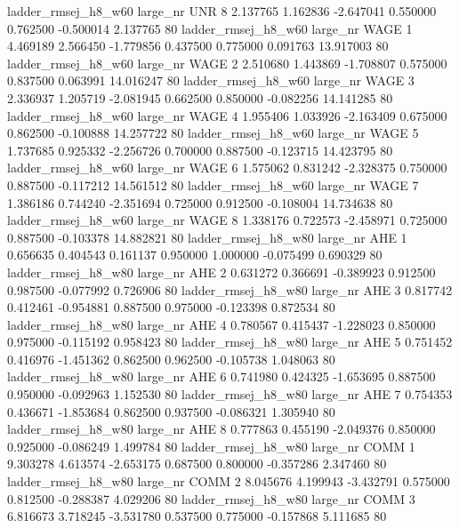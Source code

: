 ladder_rmsej_h8_w60   large_nr      UNR                 8  2.137765  1.162836  -2.647041 0.550000 0.762500 -0.500014    2.137765 80
ladder_rmsej_h8_w60   large_nr     WAGE                 1  4.469189  2.566450  -1.779856 0.437500 0.775000  0.091763   13.917003 80
ladder_rmsej_h8_w60   large_nr     WAGE                 2  2.510680  1.443869  -1.708807 0.575000 0.837500  0.063991   14.016247 80
ladder_rmsej_h8_w60   large_nr     WAGE                 3  2.336937  1.205719  -2.081945 0.662500 0.850000 -0.082256   14.141285 80
ladder_rmsej_h8_w60   large_nr     WAGE                 4  1.955406  1.033926  -2.163409 0.675000 0.862500 -0.100888   14.257722 80
ladder_rmsej_h8_w60   large_nr     WAGE                 5  1.737685  0.925332  -2.256726 0.700000 0.887500 -0.123715   14.423795 80
ladder_rmsej_h8_w60   large_nr     WAGE                 6  1.575062  0.831242  -2.328375 0.750000 0.887500 -0.117212   14.561512 80
ladder_rmsej_h8_w60   large_nr     WAGE                 7  1.386186  0.744240  -2.351694 0.725000 0.912500 -0.108004   14.734638 80
ladder_rmsej_h8_w60   large_nr     WAGE                 8  1.338176  0.722573  -2.458971 0.725000 0.887500 -0.103378   14.882821 80
ladder_rmsej_h8_w80   large_nr      AHE                 1  0.656635  0.404543   0.161137 0.950000 1.000000 -0.075499    0.690329 80
ladder_rmsej_h8_w80   large_nr      AHE                 2  0.631272  0.366691  -0.389923 0.912500 0.987500 -0.077992    0.726906 80
ladder_rmsej_h8_w80   large_nr      AHE                 3  0.817742  0.412461  -0.954881 0.887500 0.975000 -0.123398    0.872534 80
ladder_rmsej_h8_w80   large_nr      AHE                 4  0.780567  0.415437  -1.228023 0.850000 0.975000 -0.115192    0.958423 80
ladder_rmsej_h8_w80   large_nr      AHE                 5  0.751452  0.416976  -1.451362 0.862500 0.962500 -0.105738    1.048063 80
ladder_rmsej_h8_w80   large_nr      AHE                 6  0.741980  0.424325  -1.653695 0.887500 0.950000 -0.092963    1.152530 80
ladder_rmsej_h8_w80   large_nr      AHE                 7  0.754353  0.436671  -1.853684 0.862500 0.937500 -0.086321    1.305940 80
ladder_rmsej_h8_w80   large_nr      AHE                 8  0.777863  0.455190  -2.049376 0.850000 0.925000 -0.086249    1.499784 80
ladder_rmsej_h8_w80   large_nr     COMM                 1  9.303278  4.613574  -2.653175 0.687500 0.800000 -0.357286    2.347460 80
ladder_rmsej_h8_w80   large_nr     COMM                 2  8.045676  4.199943  -3.432791 0.575000 0.812500 -0.288387    4.029206 80
ladder_rmsej_h8_w80   large_nr     COMM                 3  6.816673  3.718245  -3.531780 0.537500 0.775000 -0.157868    5.111685 80
